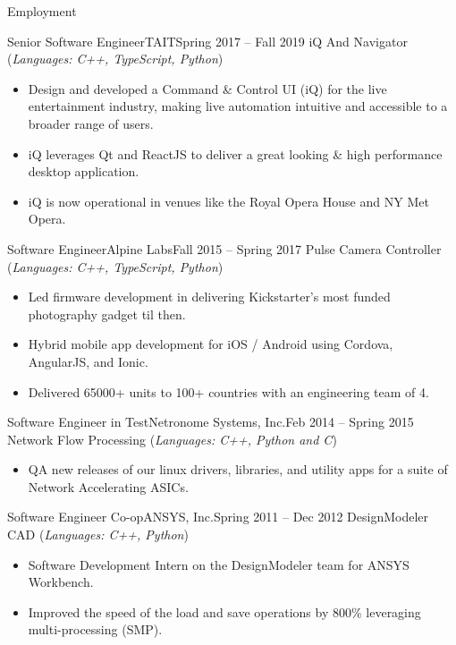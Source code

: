 \documentclass[]{mussocv}
\begin{document}
\begin{cvsection}{Employment}
		\begin{cvsubsection}{Senior Software Engineer}{TAIT}{Spring 2017 -- Fall 2019}
			iQ And Navigator (\textit{Languages: C++, TypeScript, Python})
			\begin{itemize}
				\item Design and developed a Command \& Control UI (iQ) for the live entertainment industry, making live automation intuitive and accessible to a broader range of users.
				\item iQ leverages Qt and ReactJS to deliver a great looking \& high performance desktop application.
				\item iQ is now operational in venues like the Royal Opera House and NY Met Opera.
			\end{itemize}
		\end{cvsubsection}
		
		\begin{cvsubsection}{Software Engineer}{Alpine Labs}{Fall 2015 -- Spring 2017}
			Pulse Camera Controller	(\textit{Languages: C++, TypeScript, Python})
			\begin{itemize}
				\item Led firmware development in delivering Kickstarter's most funded photography gadget til then.
				\item Hybrid mobile app development for iOS / Android using Cordova, AngularJS, and Ionic.
				\item Delivered 65000+ units to 100+ countries with an engineering team of 4.
			\end{itemize}
		\end{cvsubsection}

		\begin{cvsubsection}{Software Engineer in Test}{Netronome Systems, Inc.}{Feb 2014 -- Spring 2015}
			Network Flow Processing (\textit{Languages: C++, Python and C})
			\begin{itemize}
				\item QA new releases of our linux drivers, libraries, and utility apps for a suite of Network Accelerating ASICs.
			\end{itemize}
		\end{cvsubsection}

		\begin{cvsubsection}{Software Engineer Co-op}{ANSYS, Inc.}{Spring 2011 -- Dec 2012}
			DesignModeler CAD (\textit{Languages: C++, Python})
			\begin{itemize}
				\item Software Development Intern on the DesignModeler team for ANSYS Workbench. 
				\item Improved the speed of the load and save operations by 800\% leveraging multi-processing (SMP).
			\end{itemize}
		\end{cvsubsection}
	\end{cvsection}
	
\end{document}
